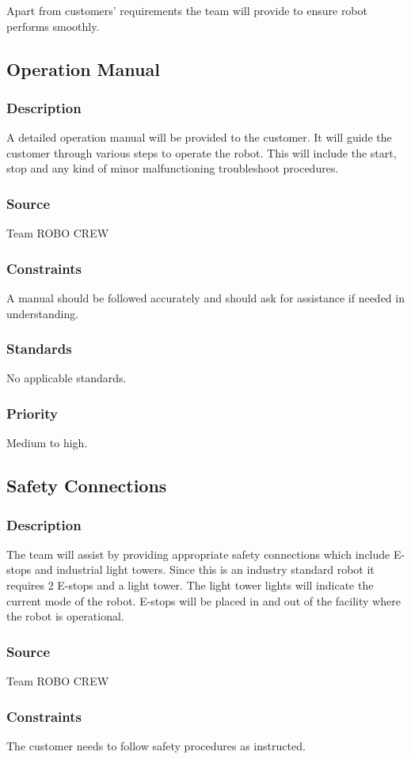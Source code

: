 Apart from customers' requirements the team will provide to ensure robot performs smoothly. 
\subsection{Operation Manual}
\subsubsection{Description}
A detailed operation manual will be provided to the customer. It will guide the customer through various steps to operate the robot. This will include the start, stop and any kind of minor malfunctioning troubleshoot procedures.  
\subsubsection{Source}
Team ROBO CREW 
\subsubsection{Constraints}
A manual should be followed accurately and should ask for assistance if needed in understanding. \subsubsection{Standards}
No applicable standards. 
\subsubsection{Priority}
Medium to high.

\subsection{Safety Connections}
\subsubsection{Description}
The team will assist by providing appropriate safety connections which include E-stops and industrial light towers. Since this is an industry standard robot it requires 2 E-stops and a light tower. The light tower lights will indicate the current mode of the robot. E-stops will be placed in and out of the facility where the robot is operational. 
\subsubsection{Source}
Team ROBO CREW 
\subsubsection{Constraints}
The customer needs to follow safety procedures as instructed. 
